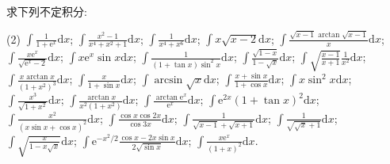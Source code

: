 \begin{exercise}[4.1.7]
    求下列不定积分:
    \begin{tasks}(2)
        \task $\displaystyle \int \frac{1}{1 + \mathrm{e}^x} \mathrm{d}x$;
        \task $\displaystyle \int \frac{x^2 - 1}{x^4 + x^2 + 1} \mathrm{d}x$;
        \task $\displaystyle \int \frac{1}{x^4 + x^6} \mathrm{d}x$;
        \task $\displaystyle \int x \sqrt{x - 2} \mathrm{d}x$;
        \task $\displaystyle \int \frac{\sqrt{x - 1} \arctan \sqrt{x - 1}}{x} \mathrm{d}x$;
        \task $\displaystyle \int \frac{x \mathrm{e}^x}{\sqrt{\mathrm{e}^{x} - 2}} \mathrm{d}x$;
        \task $\displaystyle \int x \mathrm{e}^x \sin x \mathrm{d}x$;
        \task $\displaystyle \int \frac{1}{(1 + \tan x) \sin^2 x} \mathrm{d}x$;
        \task $\displaystyle \int \frac{\sqrt{1 - x}}{1 - \sqrt x} \mathrm{d}x$;
        \task $\displaystyle \int \sqrt{\frac{x - 1}{x + 1}} \frac{1}{x^2} \mathrm{d}x$;
        \task $\displaystyle \int \frac{x \arctan x}{(1 + x^2)^3} \mathrm{d}x$;
        \task $\displaystyle \int \frac{x}{1 + \sin x} \mathrm{d}x$;
        \task $\displaystyle \int \arcsin \sqrt{x} \mathrm{d}x$;
        \task $\displaystyle \int \frac{x + \sin x}{1 + \cos x} \mathrm{d}x$;
        \task $\displaystyle \int x \sin^2 x \mathrm{d}x$;
        \task $\displaystyle \int \frac{x^3}{\sqrt{1 + x^2}} \mathrm{d}x$;
        \task $\displaystyle \int \frac{\arctan x}{x^2 (1 + x^2)} \mathrm{d}x$;
        \task $\displaystyle \int \frac{\arctan \mathrm{e}^x}{\mathrm{e}^x} \mathrm{d}x$;
        \task $\displaystyle \int \mathrm{e}^{2x} (1 + \tan x)^2 \mathrm{d}x$;
        \task $\displaystyle \int \frac{x^2}{(x \sin x + \cos x)^2} \mathrm{d}x$;
        \task $\displaystyle \int \frac{\cos x \cos 2x}{\cos 3x} \mathrm{d}x$;
        \task $\displaystyle \int \frac{1}{\sqrt{x - 1} + \sqrt{x + 1}} \mathrm{d}x$;
        \task $\displaystyle \int \frac{1}{\sqrt{\sqrt{x}+1}} \mathrm{d}x$;
        \task $\displaystyle \int \sqrt{\frac{x}{1 - x \sqrt{x}}} \mathrm{d}x$;
        \task $\displaystyle \int \mathrm{e}^{-x^2/2} \frac{\cos x - 2x \sin x}{2 \sqrt{\sin x}} \mathrm{d}x$;
        \task $\displaystyle \int \frac{x \mathrm{e}^x}{(1 + x)^2} \mathrm{d}x$.
    \end{tasks}
\end{exercise}

